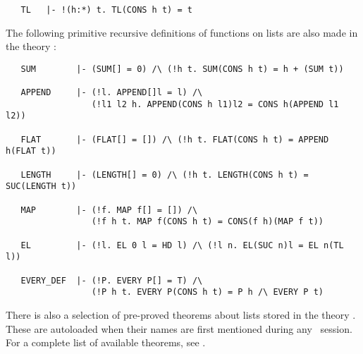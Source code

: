 {{\begin{hol}
\begin{verbatim}
   TL   |- !(h:*) t. TL(CONS h t) = t
\end{verbatim}\end{hol}

\noindent The following primitive recursive definitions of functions on lists 
are also made in the theory :


\begin{hol}

\begin{verbatim}
   SUM        |- (SUM[] = 0) /\ (!h t. SUM(CONS h t) = h + (SUM t))

   APPEND     |- (!l. APPEND[]l = l) /\
                 (!l1 l2 h. APPEND(CONS h l1)l2 = CONS h(APPEND l1 l2))

   FLAT       |- (FLAT[] = []) /\ (!h t. FLAT(CONS h t) = APPEND h(FLAT t))

   LENGTH     |- (LENGTH[] = 0) /\ (!h t. LENGTH(CONS h t) = SUC(LENGTH t))

   MAP        |- (!f. MAP f[] = []) /\
                 (!f h t. MAP f(CONS h t) = CONS(f h)(MAP f t))

   EL         |- (!l. EL 0 l = HD l) /\ (!l n. EL(SUC n)l = EL n(TL l))

   EVERY_DEF  |- (!P. EVERY P[] = T) /\
                 (!P h t. EVERY P(CONS h t) = P h /\ EVERY P t)
\end{verbatim}\end{hol}

\noindent There is also a selection of pre-proved theorems about lists stored
in the theory \ml{list}. These are autoloaded when their names are first
mentioned during any \HOL\ session. For a complete list of available theorems,
see \REFERENCE.

}}
